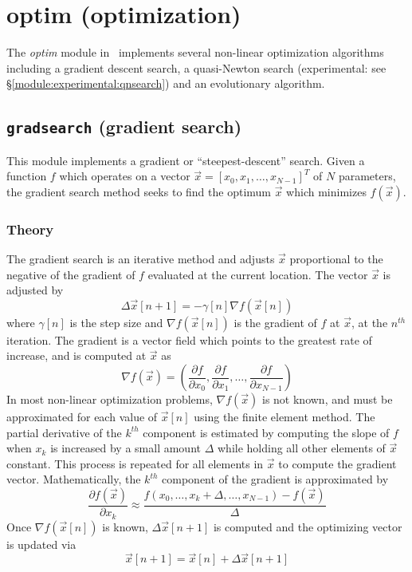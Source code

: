 % 
%

\newpage
\section{optim (optimization)}
\label{module:optim}
The {\em optim} module in \liquid\ implements several non-linear
optimization algorithms including
a gradient descent search,
a quasi-Newton search (experimental:
  see \S\ref{module:experimental:qnsearch})
and an evolutionary algorithm.

\subsection{{\tt gradsearch} (gradient search)}
\label{module:optim:gradsearch}
This module implements a gradient or ``steepest-descent'' search.
Given a function $f$ which operates on a vector
$\vec{x} = [x_0,x_1,\ldots,x_{N-1}]^T$ of $N$ parameters,
the gradient search method seeks to find the optimum $\vec{x}$ which
minimizes $f(\vec{x})$.

\subsubsection{Theory}
The gradient search is an iterative method and adjusts $\vec{x}$ proportional
to the negative of the gradient of $f$ evaluated at the current location.
The vector $\vec{x}$ is adjusted by
\[
    \Delta \vec{x}[n+1] = -\gamma[n] \nabla f(\vec{x}[n])
\]
where $\gamma[n]$ is the step size and
$\nabla f(\vec{x}[n])$ is the gradient of $f$ at $\vec{x}$, at the $n^{th}$
iteration.
The gradient is a vector field which points to the greatest rate of increase,
and is computed at $\vec{x}$ as
\[
    \nabla f(\vec{x}) = \left(
        \frac{\partial f}{\partial x_0},
        \frac{\partial f}{\partial x_1},
        \ldots,
        \frac{\partial f}{\partial x_{N-1}}
    \right)
\]
In most non-linear optimization problems, $\nabla f(\vec{x})$ is not known,
and must be approximated for each value of $\vec{x}[n]$ using the finite element
method.
The partial derivative of the $k^{th}$ component is estimated by computing the
slope of $f$ when $x_k$ is increased by a small amount $\Delta$ while holding
all other elements of $\vec{x}$ constant.
This process is repeated for all elements in $\vec{x}$ to compute the gradient
vector.
Mathematically, the $k^{th}$ component of the gradient is approximated by
\[
    \frac{\partial f(\vec{x})}{\partial x_k} \approx 
    \frac{f(x_0,\ldots,x_k+\Delta,\ldots,x_{N-1}) - f(\vec{x})}{\Delta}
\]
Once $\nabla f(\vec{x}[n])$ is known, $\Delta\vec{x}[n+1]$ is computed and the
optimizing vector is updated via
\[
    \vec{x}[n+1] = \vec{x}[n] + \Delta\vec{x}[n+1]
\]

